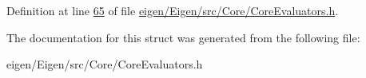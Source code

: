 Definition at line \hyperlink{eigen_2_eigen_2src_2_core_2_core_evaluators_8h_source_l00065}{65} of file \hyperlink{eigen_2_eigen_2src_2_core_2_core_evaluators_8h_source}{eigen/\+Eigen/src/\+Core/\+Core\+Evaluators.\+h}.



The documentation for this struct was generated from the following file\+:\begin{DoxyCompactItemize}
\item 
eigen/\+Eigen/src/\+Core/\+Core\+Evaluators.\+h\end{DoxyCompactItemize}
